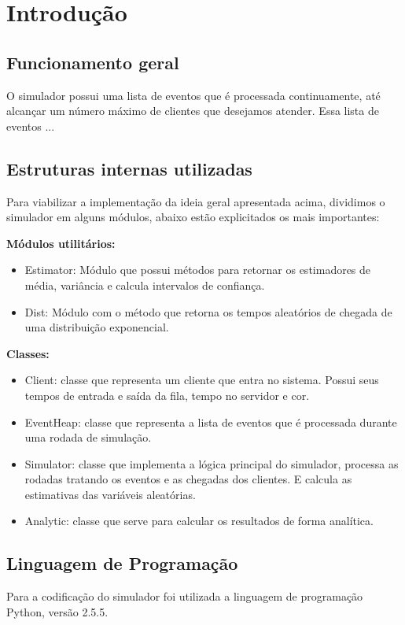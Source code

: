 \chapter{Introdução}
\section{Funcionamento geral}
O simulador possui uma lista de eventos que é processada continuamente, até alcançar um número máximo de clientes que desejamos atender.
Essa lista de eventos ...

\section{Estruturas internas utilizadas}
Para viabilizar a implementação da ideia geral apresentada acima, dividimos o simulador em alguns módulos, abaixo estão explicitados os mais importantes:

\textbf{Módulos utilitários:}

\begin{itemize}
  \item Estimator: Módulo que possui métodos para retornar os estimadores de média, variância e calcula intervalos de confiança.
  \item Dist: Módulo com o método que retorna os tempos aleatórios de chegada de uma distribuição exponencial.
\end{itemize}

\textbf{Classes:}

\begin{itemize}
  \item Client: classe que representa um cliente que entra no sistema. Possui seus tempos de entrada e saída da fila, tempo no servidor e cor.
  \item EventHeap: classe que representa a lista de eventos que é processada durante uma rodada de simulação.
  \item Simulator: classe que implementa a lógica principal do simulador, processa as rodadas tratando os eventos e as chegadas dos clientes. E calcula as estimativas das variáveis aleatórias.
  \item Analytic: classe que serve para calcular os resultados de forma analítica.
\end{itemize}

\section{Linguagem de Programação}
Para a codificação do simulador foi utilizada a linguagem de programação Python, versão 2.5.5.


